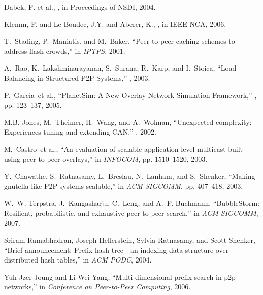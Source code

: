 \documentclass[fleqn,12pt,twoside]{article}
\begin{document}
\begin{thebibliography}{10}
Dabek, F. et al.,
,
\newblock in {Proceedings of NSDI}, 2004.

Klemm, F. and Le Boudec, J.Y. and Aberer, K.,
,
\newblock in {IEEE NCA}, 2006.

T.~Stading, P.~Maniatis, and M.~Baker,
\newblock ``{Peer-to-peer caching schemes to address flash crowds},''
\newblock in {\em IPTPS}, 2001.

A.~Rao, K.~Lakshminarayanan, S.~Surana, R.~Karp, and I.~Stoica,
\newblock ``{Load Balancing in Structured P2P Systems},''
, 2003.

P.~Garc{\'\i}a~et al.,
\newblock ``{PlanetSim: A New Overlay Network Simulation Framework},''
, pp. 123--137, 2005.

M.B. Jones, M.~Theimer, H.~Wang, and A.~Wolman,
\newblock ``{Unexpected complexity: Experiences tuning and extending CAN},''
, 2002.

M.~Castro~et al.,
\newblock ``An evaluation of scalable application-level multicast built using
  peer-to-peer overlays,''
\newblock in {\em INFOCOM}, pp. 1510--1520, 2003.

Y.~Chawathe, S.~Ratnasamy, L.~Breslau, N.~Lanham, and S.~Shenker,
\newblock ``{Making gnutella-like P2P systems scalable},''
\newblock in {\em ACM SIGCOMM}, pp. 407--418, 2003.

W.~W. Terpstra, J.~Kangasharju, C.~Leng, and A.~P. Buchmann,
\newblock ``{BubbleStorm}: Resilient, probabilistic, and exhaustive
  peer-to-peer search,''
\newblock in {\em ACM SIGCOMM}, 2007.

Sriram Ramabhadran, Joseph Hellerstein, Sylvia Ratnasamy, and Scott Shenker,
\newblock ``Brief announcement: Prefix hash tree - an indexing data structure
  over distributed hash tables,''
\newblock in {\em ACM PODC}, 2004.

Yuh-Jzer Joung and Li-Wei Yang,
\newblock ``Multi-dimensional prefix search in p2p networks,''
\newblock in {\em Conference on Peer-to-Peer Computing},
2006.


\end{thebibliography}
\end{document}
